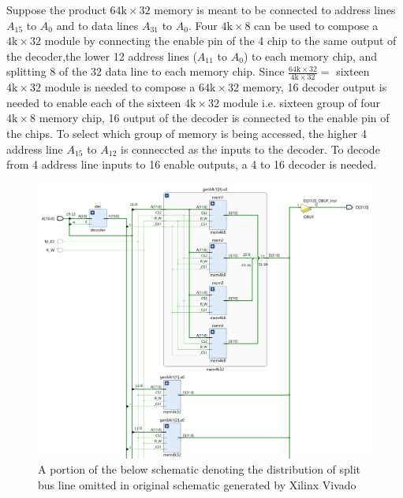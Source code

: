 \documentclass{article}
\begin{document}
Suppose the product $64\text{k}\times32$ memory is meant to be connected to address lines $A_{15}$ to $A_{0}$ and to data lines $A_{31}$ to $A_{0}$. 
Four $4\text{k}\times8$ can be used to compose a $4\text{k}\times32$ module by connecting the enable pin of the 4 chip to the same output of the decoder,the lower 12 address lines ($A_{11}$ to $A_{0}$) to each memory chip, and splitting 8 of the 32 data line to each memory chip.
Since $\frac{64\text{k}\times32}{4\text{k}\times32}=$ sixteen $4\text{k}\times32$ module is needed to compose a $64\text{k}\times32$ memory, 16 decoder output is needed to enable each of the sixteen $4\text{k}\times32$ module i.e. sixteen group of four $4\text{k}\times8$ memory chip, 16 output of the decoder is connected to the enable pin of the chips. To select which group of memory is being accessed, the higher 4 address line $A_{15}$ to $A_{12}$ is conneccted as the inputs to the decoder. To decode from 4 address line inputs to 16 enable outputs, a 4 to 16 decoder is needed.
\begin{figure}[H]
  \centering
  \includegraphics[width=\textwidth]{ECE3301_Assignment3_Zoomin.png}
  \caption{A portion of the below schematic denoting the distribution of split bus line omitted in original schematic generated by Xilinx Vivado}
\end{figure}


\newpage

\end{document}
